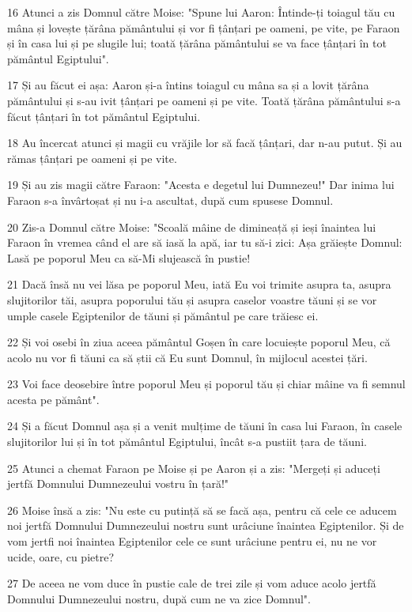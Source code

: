 \par 16 Atunci a zis Domnul către Moise: "Spune lui Aaron: Întinde-ți toiagul tău cu mâna și lovește țărâna pământului și vor fi țânțari pe oameni, pe vite, pe Faraon și în casa lui și pe slugile lui; toată țărâna pământului se va face țânțari în tot pământul Egiptului".
\par 17 Și au făcut ei așa: Aaron și-a întins toiagul cu mâna sa și a lovit țărâna pământului și s-au ivit țânțari pe oameni și pe vite. Toată țărâna pământului s-a făcut țânțari în tot pământul Egiptului.
\par 18 Au încercat atunci și magii cu vrăjile lor să facă țânțari, dar n-au putut. Și au rămas țânțari pe oameni și pe vite.
\par 19 Și au zis magii către Faraon: "Acesta e degetul lui Dumnezeu!" Dar inima lui Faraon s-a învârtoșat și nu i-a ascultat, după cum spusese Domnul.
\par 20 Zis-a Domnul către Moise: "Scoală mâine de dimineață și ieși înaintea lui Faraon în vremea când el are să iasă la apă, iar tu să-i zici: Așa grăiește Domnul: Lasă pe poporul Meu ca să-Mi slujească în pustie!
\par 21 Dacă însă nu vei lăsa pe poporul Meu, iată Eu voi trimite asupra ta, asupra slujitorilor tăi, asupra poporului tău și asupra caselor voastre tăuni și se vor umple casele Egiptenilor de tăuni și pământul pe care trăiesc ei.
\par 22 Și voi osebi în ziua aceea pământul Goșen în care locuiește poporul Meu, că acolo nu vor fi tăuni ca să știi că Eu sunt Domnul, în mijlocul acestei țări.
\par 23 Voi face deosebire între poporul Meu și poporul tău și chiar mâine va fi semnul acesta pe pământ".
\par 24 Și a făcut Domnul așa și a venit mulțime de tăuni în casa lui Faraon, în casele slujitorilor lui și în tot pământul Egiptului, încât s-a pustiit țara de tăuni.
\par 25 Atunci a chemat Faraon pe Moise și pe Aaron și a zis: "Mergeți și aduceți jertfă Domnului Dumnezeului vostru în țară!"
\par 26 Moise însă a zis: "Nu este cu putință să se facă așa, pentru că cele ce aducem noi jertfă Domnului Dumnezeului nostru sunt urâciune înaintea Egiptenilor. Și de vom jertfi noi înaintea Egiptenilor cele ce sunt urâciune pentru ei, nu ne vor ucide, oare, cu pietre?
\par 27 De aceea ne vom duce în pustie cale de trei zile și vom aduce acolo jertfă Domnului Dumnezeului nostru, după cum ne va zice Domnul".
